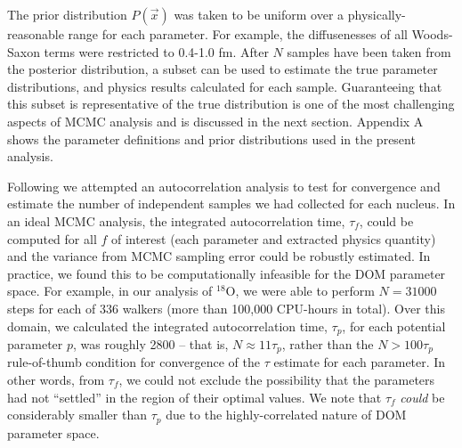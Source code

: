 \documentclass[twocolumn,secnumarabic,amssymb, nobibnotes, aps, prl,
superscriptaddress, nobalancelastpage]{revtex4}
\newcommand{\oEight}{\ensuremath{^{18}}O}
\begin{document}
The prior distribution $P(\vec{x})$ was taken to be uniform over a
physically-reasonable range for each parameter. For example, the
diffusenesses of all Woods-Saxon terms were restricted to 0.4-1.0 fm.
After $N$ samples have been taken from the posterior distribution,
a subset can be used to estimate the true parameter distributions,
and physics results calculated for each sample. Guaranteeing that this subset is
representative of the true distribution is one of the most challenging aspects
of MCMC analysis and is discussed in the next section. Appendix A
shows the parameter definitions and prior distributions used in the present
analysis.

Following \cite{Foreman-Mackey2013} we attempted an
autocorrelation analysis to test for convergence
and estimate the number of independent samples we had collected for each nucleus.
In an ideal MCMC analysis, the integrated autocorrelation time, $\tau_{f}$,
could be computed for all $f$ of interest (each parameter and extracted physics
quantity) and the variance from MCMC sampling error could be robustly estimated.
In practice, we found this to be computationally infeasible
for the DOM parameter space. For example, in our analysis of \oEight, we were
able to perform $N=31000$ steps for each of 336 walkers (more than 100,000
CPU-hours in total). Over this domain, we calculated the
integrated autocorrelation time, $\tau_{p}$, for each potential parameter $p$,
was roughly 2800 -- that is, $N \approx 11\tau_{p}$, rather than the
$N > 100\tau_{p}$ rule-of-thumb condition for convergence of the $\tau$ estimate
for each parameter. In other words, from $\tau_{f}$, we could not exclude the
possibility that the parameters had not ``settled'' in the region of their
optimal values. We note that $\tau_{f}$ \textit{could} be considerably
smaller than $\tau_{p}$ due to the highly-correlated nature of DOM parameter space.
\end{document}
